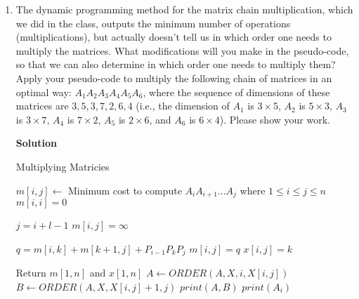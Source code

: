 \documentclass[12pt]{article}
\begin{document}
\begin{enumerate}

\item The dynamic programming method for the matrix chain multiplication, which we did in the class, outputs the minimum number of operations (multiplications), but actually doesn't tell us  in which order one needs to multiply the matrices. What modifications will you make in the pseudo-code, so that we can also determine in which order one needs to multiply them? Apply your pseudo-code to multiply the following chain of matrices in an optimal way: 
$A_1A_2A_3A_4A_5A_6$, where
the sequence of dimensions of these matrices are $3,5,3, 7, 2, 6, 4$ (i.e., the dimension of $A_1$ is $3\times 5$, $A_2$ is $5 \times 3$, 
$A_3$ is $3\times 7$, $A_4$ is $7\times 2$, $A_5$ is $2\times 6$, and $A_6$ is $6 \times 4$). 
Please show your work.

\textbf{Solution}

\begin{algorithm}
\caption{Multiplying Matricies}
\begin{algorithmic}[1]
 
	\State $m[i,j] \gets $ Minimum cost to compute $A_iA_{i+1} ... A_j$ where $1 \leq i\leq j \leq n$
		\State $m[i,i] = 0$
	\EndFor
	
		
			\State $j = i + l -1$
			\State $m[i,j] = \infty$
			
				\State $q = m[i,k] + m[k+1, j] + P_{i-1}P_kP_j$
					\State $m[i,j] = q$
					\State $x[i,j] = k$ 
				
				\EndIf
			
			\EndFor
		
		\EndFor
		
	\EndFor
	
	\State Return $m[1,n]$ and $x[1,n]$
\EndProcedure
{} 
		\State $A \gets ORDER(A, X, i, X[i, j])$
		\State $B \gets ORDER(A, X, X[i,j]+1, j)$
		\State $print (A, B)$
	\Else
		\State $print (A_i)$
	\EndIf
	
\EndProcedure
\end{algorithmic}
\end{algorithm}


\end{enumerate}
\end{document}
